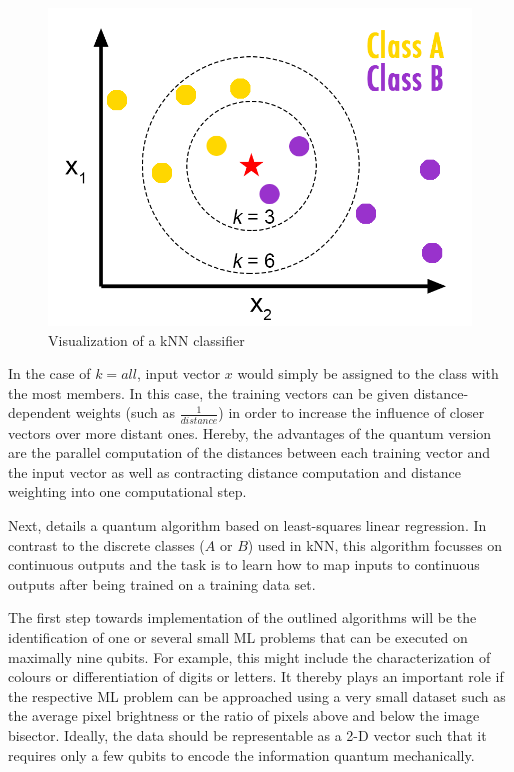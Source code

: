 \documentclass[a4paper]{article}
\newcommand*{\0}{$\ket{0}$}
\newcommand*{\1}{$\ket{1}$}
\begin{document}
\begin{figure}[!ht]
      \centering
       \includegraphics[scale=0.6]{knn-concept.png}
       \caption[caption for kNN]{\label{fig:knnconcept} Visualization of a kNN classifier\footnotemark[1]}
\end{figure}


In the case of $k = all$, input vector $x$ would simply be assigned to the class with the most members. In this case, the training vectors can be given distance-dependent weights (such as $\frac{1}{distance}$) in order to increase the influence of closer vectors over more distant ones. Hereby, the advantages of the quantum version are the parallel computation of the distances between each training vector and the input vector as well as contracting distance computation and distance weighting into one computational step.

Next, \cite{Schuld2016} details a quantum algorithm based on least-squares linear regression. In contrast to the discrete classes ($A$ or $B$) used in kNN, this algorithm focusses on continuous outputs and the task is to learn how to map inputs to continuous outputs after being trained on a training data set.

The first step towards implementation of the outlined algorithms will be the identification of one or several small ML problems that can be executed on maximally nine qubits. For example, this might include the characterization of colours or differentiation of digits or letters. It thereby plays an important role if the respective ML problem can be approached using a very small dataset such as the average pixel brightness or the ratio of pixels above and below the image bisector. Ideally, the data should be representable as a 2-D vector such that it requires only a few qubits to encode the information quantum mechanically.
\end{document}
